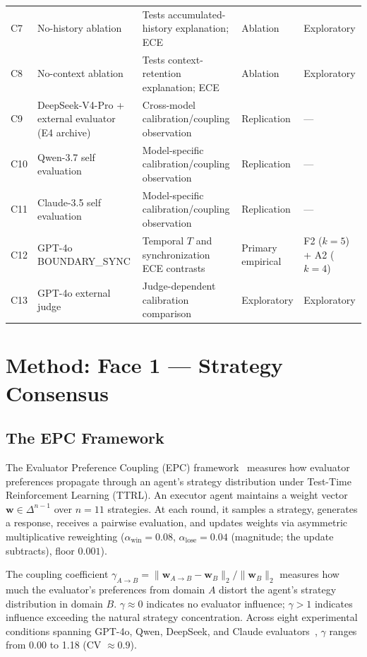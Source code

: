\documentclass[11pt]{article}
\begin{document}
\begin{table}[t]
\begin{tabularx}{\textwidth}{@{}l p{} X p{} p{}@{}}
C7 & No-history ablation & Tests accumulated-history explanation; ECE & Ablation & Exploratory \\
C8 & No-context ablation & Tests context-retention explanation; ECE & Ablation & Exploratory \\
C9 & DeepSeek-V4-Pro + external evaluator (E4 archive) & Cross-model calibration/coupling observation & Replication & --- \\
C10 & Qwen-3.7 self evaluation & Model-specific calibration/coupling observation & Replication & --- \\
C11 & Claude-3.5 self evaluation & Model-specific calibration/coupling observation & Replication & --- \\
C12 & GPT-4o BOUNDARY\_SYNC & Temporal $T$ and synchronization ECE contrasts & Primary empirical & F2 ($k{=}5$) + A2 ($k{=}4$) \\
C13 & GPT-4o external judge & Judge-dependent calibration comparison & Exploratory & Exploratory \\
\bottomrule
\end{tabularx}
\end{table}

\section{Method: Face 1 --- Strategy Consensus}

\subsection{The EPC Framework}

The Evaluator Preference Coupling (EPC) framework~\cite{mmepc2026} measures how evaluator preferences propagate through an agent's strategy distribution under Test-Time Reinforcement Learning (TTRL). An executor agent maintains a weight vector $\mathbf{w} \in \Delta^{n-1}$ over $n = 11$ strategies. At each round, it samples a strategy, generates a response, receives a pairwise evaluation, and updates weights via asymmetric multiplicative reweighting ($\alpha_{\text{win}} = 0.08$, $\alpha_{\text{lose}} = 0.04$ (magnitude; the update subtracts), floor $0.001$).

The coupling coefficient $\gamma_{A \to B} = \|\mathbf{w}_{A \to B} - \mathbf{w}_B\|_2 / \|\mathbf{w}_B\|_2$ measures how much the evaluator's preferences from domain $A$ distort the agent's strategy distribution in domain $B$. $\gamma \approx 0$ indicates no evaluator influence; $\gamma > 1$ indicates influence exceeding the natural strategy concentration. Across eight experimental conditions spanning GPT-4o, Qwen, DeepSeek, and Claude evaluators~\cite{mmepc2026}, $\gamma$ ranges from 0.00 to 1.18 (CV $\approx 0.9$).
\end{document}
